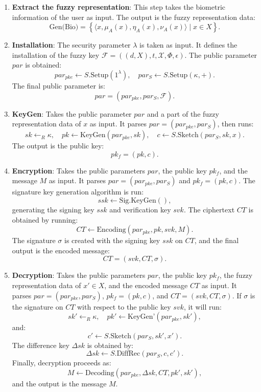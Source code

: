 \documentclass[graybox]{svmult}
\begin{document}
\begin{enumerate}
    \item \textbf{Extract the fuzzy representation}: This step takes the biometric information of the user as input. The output is the fuzzy representation data:
          \[
              \text{Gen(Bio)} = \left\{ \langle x, \mu_A(x), \eta_A(x), \nu_A(x) \rangle \mid x \in X \right\}.
          \]

    \item \textbf{Installation}: The security parameter $\lambda$ is taken as input. It defines the installation of the fuzzy key $\mathcal{F} = ((d, X), t, \mathcal{X}, \Phi, \epsilon)$. The public parameter $par$ is obtained:
          \[
              par_{pke} \leftarrow S.\text{Setup}(1^\lambda), \quad par_S \leftarrow S.\text{Setup}(\kappa, +).
          \]
          The final public parameter is:
          \[
              par = (par_{pke}, par_S, \mathcal{F}).
          \]

    \item \textbf{KeyGen}: Takes the public parameter $par$ and a part of the fuzzy representation data of $x$ as input. It parses $par = (par_{pke}, par_S)$, then runs:
          \[
              sk \leftarrow_R \kappa, \quad pk \leftarrow \text{KeyGen}(par_{pke}, sk), \quad c \leftarrow S.\text{Sketch}(par_S, sk, x).
          \]
          The output is the public key:
          \[
              pk_f = (pk, c).
          \]

    \item \textbf{Encryption}: Takes the public parameters $par$, the public key $pk_f$, and the message $M$ as input. It parses $par = (par_{pke}, par_S)$ and $pk_f = (pk, c)$. The signature key generation algorithm is run:
          \[
              ssk \leftarrow \text{Sig.KeyGen}(),
          \]
          generating the signing key $ssk$ and verification key $svk$. The ciphertext $CT$ is obtained by running:
          \[
              CT \leftarrow \text{Encoding}(par_{pke}, pk, svk, M).
          \]
          The signature $\sigma$ is created with the signing key $ssk$ on $CT$, and the final output is the encoded message:
          \[
              CT = (svk, CT, \sigma).
          \]

    \item \textbf{Decryption}: Takes the public parameters $par$, the public key $pk_f$, the fuzzy representation data of $x' \in X$, and the encoded message $CT$ as input. It parses $par = (par_{pke}, par_S)$, $pk_f = (pk, c)$, and $CT = (svk, CT, \sigma)$. If $\sigma$ is the signature on $CT$ with respect to the public key $svk$, it will run:
          \[
              sk' \leftarrow_R \kappa, \quad pk' \leftarrow \text{KeyGen'}(par_{pke}, sk'),
          \]
          and:
          \[
              c' \leftarrow S.\text{Sketch}(par_S, sk', x').
          \]
          The difference key $\Delta sk$ is obtained by:
          \[
              \Delta sk \leftarrow S.\text{DiffRec}(par_S, c, c').
          \]
          Finally, decryption proceeds as:
          \[
              M \leftarrow \text{Decoding}(par_{pke}, \Delta sk, CT, pk', sk'),
          \]
          and the output is the message $M$.
\end{enumerate}
\end{document}
